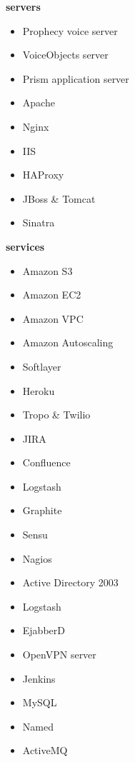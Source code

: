 \documentclass[]{friggeri-cv} %
\begin{document}
  \textbf{servers}
    \begin{multicols}{3}
      \begin{itemize}
        \item Prophecy voice server
        \item VoiceObjects server
        \item Prism application server
        \item Apache
        \item Nginx
        \item IIS
        \item HAProxy
        \item JBoss \& Tomcat
        \item Sinatra
      \end{itemize}
    \end{multicols}

  \textbf{services}
    \begin{multicols}{3}
      \begin{itemize}
        \item Amazon S3
        \item Amazon EC2
        \item Amazon VPC
        \item Amazon Autoscaling
        \item Softlayer
        \item Heroku
        \item Tropo \& Twilio
        \item JIRA
        \item Confluence
        \item Logstash
        \item Graphite
        \item Sensu
        \item Nagios
        \item Active Directory 2003
        \item Logstash
        \item EjabberD
        \item OpenVPN server
        \item Jenkins
        \item MySQL
        \item Named
        \item ActiveMQ
      \end{itemize}
    \end{multicols}
\end{document}
